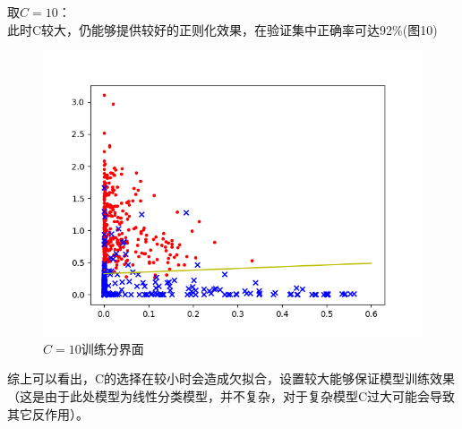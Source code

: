 \documentclass[a4paper]{article}
\begin{document}
取$ C = 10 $：\\
此时C较大，仍能够提供较好的正则化效果，在验证集中正确率可达92\%(图10)\\
\begin{figure}
    \centering
    \includegraphics[width=12cm]{Fig_11.png}
    \caption{$ C = 10 $训练分界面}
\end{figure}

综上可以看出，C的选择在较小时会造成欠拟合，设置较大能够保证模型训练效果（这是由于此处模型为线性分类模型，并不复杂，对于复杂模型C过大可能会导致其它反作用）。
\end{document}
